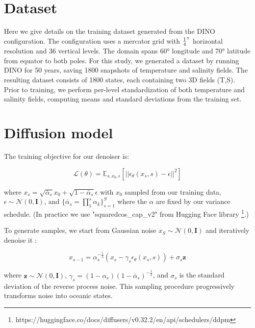 \section{Dataset}
\label{appendix:dataset}

Here we give details on the training dataset generated from the DINO configuration.
The configuration uses a mercator grid with $\frac{1}{4} \degree$ horizontal resolution and 36 vertical levels. The domain spans 60° longitude and 70° latitude from equator to both poles. For this study, we generated a dataset by running DINO for 50 years, saving 1800 snapshots of temperature and salinity fields. The resulting dataset consists of 1800 states, each containing two 3D fields (T,S). 
Prior to training, we perform per-level standardization of both temperature and salinity fields, computing means and standard deviations from the training set.

\section{Diffusion model}
\label{appendix:diffusion model}

The training objective for our denoiser is:

\begin{equation}
    \mathcal{L}(\theta) = \mathbb{E}_{s,x_0,\epsilon} [||\epsilon_\theta(x_s, s) - \epsilon||^2]
\end{equation}

where $x_s = \sqrt{\bar{\alpha}_s}x_0 + \sqrt{1-\bar{\alpha}_s}\epsilon$ with $x_0$ sampled from our training data, $\epsilon \sim \mathcal{N}(0, \mathbf{I})$, and $\{\bar{\alpha}_s = \prod_1^s \alpha_k \}_{s=1}^S$ where the $\alpha$ are fixed by our variance schedule. (In practice we use 
"squaredcos\_cap\_v2" from Hugging Face library \footnote{\small https://huggingface.co/docs/diffusers/v0.32.2/en/api/schedulers/ddpm}.)

To generate samples, we start from Gaussian noise $x_S \sim \mathcal{N}(0, \mathbf{I})$ and iteratively denoise it :

\begin{equation}
    x_{s-1} = \alpha_s^{-\frac12}(x_s - \gamma_s\epsilon_\theta(x_s, s)) + \sigma_s \mathbf{z}
\end{equation}

where $\mathbf{z} \sim \mathcal{N}(0, \mathbf{I})$, $\gamma_s = (1-\alpha_s) (1-\bar \alpha_s)^{-\frac12}$, and $\sigma_s$ is the standard deviation of the reverse process noise. This sampling procedure progressively transforms noise into oceanic states.


